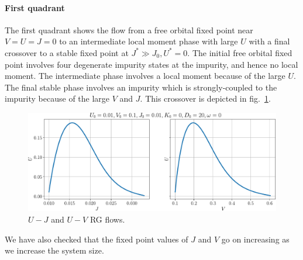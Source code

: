 \documentclass[twoside,11pt]{report}
\numberwithin{equation}{section}
\begin{document}
\paragraph*{First quadrant}
The first quadrant shows the flow from a free orbital fixed point near \(V=U=J=0\) to an intermediate local moment phase with large \(U\) with a final crossover to a stable fixed point at \(J^* \gg J_0, U^*=0\). The initial free orbital fixed point involves four degenerate impurity states at the impurity, and hence no local moment. The intermediate phase involves a local moment because of the large \(U\). The final stable phase involves an impurity which is strongly-coupled to the impurity because of the large \(V\) and \(J\). This crossover is depicted in fig.~\ref{crossover}.


\begin{figure}[htpb]
	\centering
	\includegraphics[width=\textwidth]{../figures/crossovers_new.pdf}
	\caption{\(U-J\) and \(U-V\) RG flows.}
	\label{crossover}
\end{figure}

We have also checked that the fixed point values of \(J\) and \(V\) go on increasing as we increase the system size.
\end{document}
